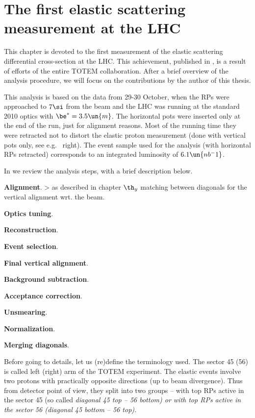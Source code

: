 \iffalse
DPE, SD, MC
\fi

\chapter[felm]{The first elastic scattering measurement at the LHC}

This chapter is devoted to the first measurement of the elastic scattering differential cross-section at the LHC. This achievement, published in , is a result of efforts of the entire TOTEM collaboration. After a brief overview of the analysis procedure, we will focus on the contributions by the author of this thesis.

This analysis is based on the data from 29-30 October, when the RPs were approached to $7\si$ from the beam and the LHC was running at the standard 2010 optics with $\be^* = 3.5\un{m}$. The horizontal pots were inserted only at the end of the run, just for alignment reasons. Most of the running time they were retracted not to distort the elastic proton measurement (done with vertical pots only, see e.g.~ right). The event sample used for the analysis (with horizontal RPs retracted) corresponds to an integrated luminosity of $6.1\un{nb^-1}$.


In  we review the analysis steps, with a brief description below.

\> {\bf Alignment}.
\>> as described in chapter 
\> $\th_y$ matching between diagonals for the vertical alignment wrt. the beam.

\> {\bf Optics tuning}.

\> {\bf Reconstruction}.

\> {\bf Event selection}.

\> {\bf Final vertical alignment}.

\> {\bf Background subtraction}.

\> {\bf Acceptance correction}.

\> {\bf Unsmearing}.

\> {\bf Normalization}.

\> {\bf Merging diagonals}.



Before going to details, let us (re)define the terminology used. The sector 45 (56) is called left (right) arm of the TOTEM experiment. The elastic events involve two protons with practically opposite directions (up to beam divergence). Thus from detector point of view, they split into two groups -- with top RPs active in the sector 45 (so called \em{diagonal} 45 top -- 56 bottom) or with top RPs active in the sector 56 (diagonal 45 bottom -- 56 top).


